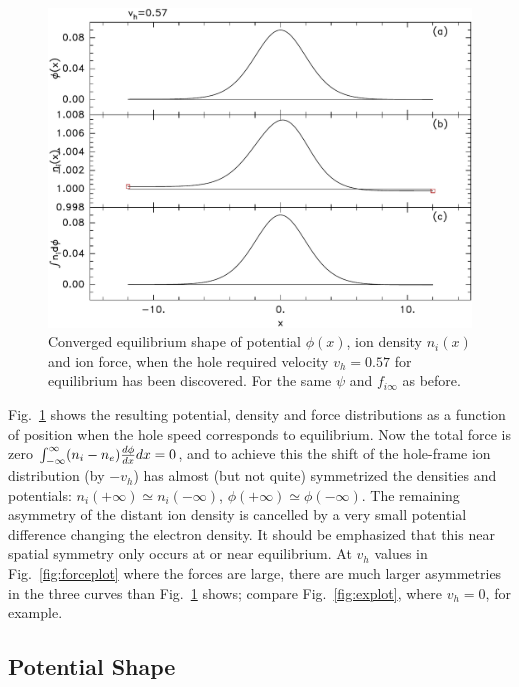 \documentclass[12pt]{article}
\begin{document}
\begin{figure}[htp]
  \centering
  \includegraphics[width=0.7\hsize]{convplot}
  \caption{Converged equilibrium shape of potential $\phi(x)$, ion
    density $n_i(x)$ and ion force, when the hole required velocity
    $v_h=0.57$ for equilibrium has been discovered. For the same
    $\psi$ and $f_{i\infty}$ as before.}
  \label{fig:convplot}
\end{figure}
Fig.\ \ref{fig:convplot} shows the resulting potential, density and
force distributions as a function of position when the hole speed
corresponds to equilibrium. Now the total force is zero
$\int_{-\infty}^\infty (n_i-n_e){d\phi\over dx} dx=0$, and to achieve this the shift of
the hole-frame ion distribution (by $-v_h$) has almost (but not quite)
symmetrized the densities and potentials:
$n_i(+\infty)\simeq n_i(-\infty)$,
$\phi(+\infty)\simeq \phi(-\infty)$. The remaining asymmetry of the
distant ion density is cancelled by a very small potential difference
changing the electron density. It should be emphasized that this near
spatial symmetry only occurs at or near equilibrium. At $v_h$ values
in Fig.\ \ref{fig:forceplot} where the forces are large, there are
much larger asymmetries in the three curves than Fig.\ \ref{fig:convplot}
shows; compare Fig.\ \ref{fig:explot}, where $v_h=0$, for example.



\subsection{Potential Shape}
\end{document}
